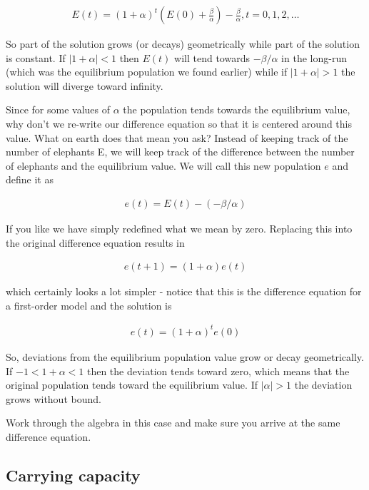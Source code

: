 \begin{eqnarray*}
E(t) = (1 + \alpha)^t (E(0) + \frac{\beta}{\alpha}) - \frac{\beta}{\alpha}, t=0,1,2,\ldots
\end{eqnarray*}

So part of the solution grows (or decays) geometrically while part of the solution is constant. If $|1 + \alpha| < 1$ then $E(t)$ will tend towards $-\beta/\alpha$ in the long-run (which was the equilibrium population we found earlier) while if $|1 + \alpha| > 1$ the solution will diverge toward infinity. 

Since for some values of $\alpha$ the population tends towards the equilibrium value, why don't we re-write our difference equation so that it is centered around this value. What on earth does that mean you ask? Instead of keeping track of the number of elephants E, we will keep track of the difference between the number of elephants and the equilibrium value. We will call this new population $e$ and define it as

\begin{eqnarray*}
e(t) = E(t)-(-\beta/\alpha)
\end{eqnarray*}

If you like we have simply redefined what we mean by zero. Replacing this into the original difference equation results in

\begin{eqnarray*}
e(t+1) = (1 + \alpha) e(t)
\end{eqnarray*}

which certainly looks a lot simpler - notice that this is the difference equation for a first-order model and the solution is

\begin{eqnarray*}
e(t) = (1 + \alpha)^t e(0)
\end{eqnarray*}

So, deviations from the equilibrium population value grow or decay geometrically. If $-1 <1+ \alpha < 1$ then the deviation tends toward zero, which means that the original population tends toward the equilibrium value. If $|\alpha| > 1$ the deviation grows without bound.  

\begin{del}
Work through the algebra in this case and make sure you arrive at the same difference equation.
\end{del}

\subsection{Carrying capacity}

